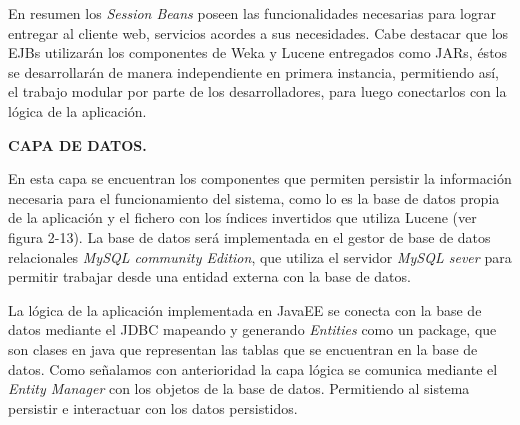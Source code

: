 \documentclass{memoria}
\begin{document}
En resumen los \textsl{Session Beans} poseen las funcionalidades necesarias para lograr entregar al cliente web, servicios acordes a sus necesidades. Cabe destacar que los EJBs utilizarán los componentes de Weka y Lucene entregados como JARs, éstos se desarrollarán de manera independiente en primera instancia, permitiendo así, el trabajo modular por parte de los desarrolladores, para luego conectarlos con la lógica de la aplicación.\\


\textbf{CAPA DE DATOS.}

En esta capa se encuentran los componentes que permiten persistir la información necesaria para el funcionamiento del sistema, como lo es la base de datos propia de la aplicación y el fichero con los índices invertidos que utiliza Lucene (ver figura 2-13). La base de datos será implementada en el gestor de base de datos relacionales \textsl{MySQL community Edition}, que utiliza el servidor \textsl{MySQL sever} para permitir trabajar desde una entidad externa con la base de datos. 

La lógica de la aplicación implementada en JavaEE se conecta con la base de datos mediante el JDBC mapeando y generando \textsl{Entities} como un package, que son clases en java que representan las tablas que se encuentran en la base de datos. Como señalamos con anterioridad la capa lógica se comunica mediante el \textsl{Entity Manager} con los objetos de la base de datos. Permitiendo al sistema persistir e interactuar con los datos persistidos.
\end{document}
